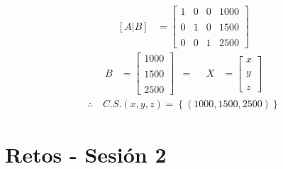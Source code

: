 \documentclass[10pt, a4paper]{article}
\begin{document}
  \begin{align*}
    \left[A|B\right]&=\left[
      \begin{array}{ccc|c}
        1 & 0 & 0 & 1000 \\\\
        0 & 1 & 0 & 1500 \\\\
        0 & 0 & 1 & 2500
      \end{array}
    \right]
  \end{align*}
  \begin{align*}
    B&=\left[
      \begin{array}{c}
        1000\\\\
        1500\\\\
        2500
      \end{array}
    \right]
    &=
    &&X&=\left[
      \begin{array}{c}
        x \\\\
        y \\\\
        z 
      \end{array}
    \right]
  \end{align*}
  \begin{align*}
    \therefore \ &C.S. \left(x,y,z\right) = \left\{\left(1000,1500,2500\right)\right\}
  \end{align*}
\newpage
\section{Retos - Sesión 2}
\end{document}
